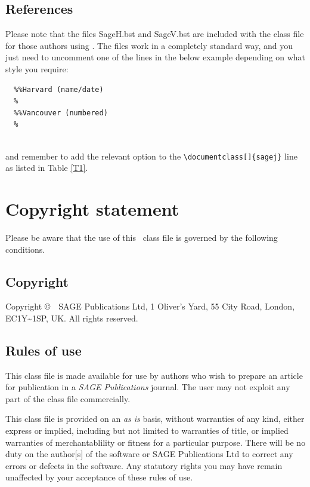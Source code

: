 \documentclass[Afour,sageh,times]{includes/tex/sagej}
\begin{document}
\subsection{References}

Please note that the files \textsf{SageH.bst} and \textsf{SageV.bst} are
included with the class file for those authors using \BibTeX. The files
work in a completely standard way, and you just need to uncomment one of
the lines in the below example depending on what style you require:

\begin{verbatim}
  %%Harvard (name/date)
  %
  %%Vancouver (numbered)
  %
  
\end{verbatim}

\noindent and remember to add the relevant option to the
\verb+\documentclass[]{sagej}+ line as listed in Table \ref{T1}.

\section{Copyright statement}

Please be aware that the use of this \LaTeXe~class file is governed by
the following conditions.

\subsection{Copyright}

Copyright \copyright~\volumeyear~SAGE Publications Ltd, 1 Oliver's Yard,
55 City Road, London, EC1Y\textasciitilde{}1SP, UK. All rights reserved.

\subsection{Rules of use}

This class file is made available for use by authors who wish to prepare
an article for publication in a \textit{SAGE Publications} journal. The
user may not exploit any part of the class file commercially.

This class file is provided on an \textit{as is} basis, without
warranties of any kind, either express or implied, including but not
limited to warranties of title, or implied warranties of
merchantablility or fitness for a particular purpose. There will be no
duty on the author{[}s{]} of the software or SAGE Publications Ltd to
correct any errors or defects in the software. Any statutory rights you
may have remain unaffected by your acceptance of these rules of use.
\end{document}
